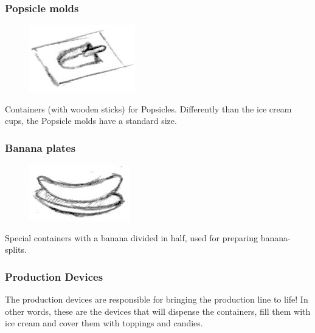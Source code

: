 \documentclass[a4paper]{scrartcl}
\begin{document}
        \subsubsection{Popsicle molds}
            \begin{minipage}[t][3em][t]{\textwidth}
                \begin{figure}
                    \vspace{-15pt}
                    \includegraphics[scale=1]{devices/popsicle_molds}
                    \vspace{-25pt}
                \end{figure}

                Containers (with wooden sticks) for Popsicles. Differently than the ice cream cups, the Popsicle molds have a standard size.
            \end{minipage}

        \subsubsection{Banana plates}
            \begin{minipage}[t][2em][t]{\textwidth}
                \begin{figure}
                    \vspace{-20pt}
                    \includegraphics[scale=1]{devices/banana_plate}
                    \vspace{-25pt}
                \end{figure}

                Special containers with a banana divided in half, used for preparing banana-splits.
            \end{minipage}

    \subsubsection{Production Devices}
        The production devices are responsible for bringing the production line to life!
        In other words, these are the devices that will dispense the containers, fill them with ice cream and cover them with toppings and candies.
\end{document}
